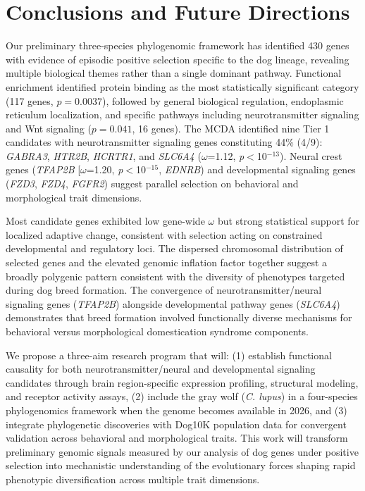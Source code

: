 \documentclass[11pt,letterpaper]{article}
\begin{document}
\section{Conclusions and Future Directions}

Our preliminary three-species phylogenomic framework has identified 430 genes with evidence of episodic positive selection specific to the dog lineage, revealing multiple biological themes rather than a single dominant pathway. Functional enrichment identified protein binding as the most statistically significant category (117 genes, $p=0.0037$), followed by general biological regulation, endoplasmic reticulum localization, and specific pathways including neurotransmitter signaling and Wnt signaling ($p=0.041$, 16 genes). The MCDA identified nine Tier 1 candidates with neurotransmitter signaling genes constituting 44\% (4/9): \textit{GABRA3}, \textit{HTR2B}, \textit{HCRTR1}, and \textit{SLC6A4} ($\omega$=1.12, \textit{p}$<$10$^{-13}$). Neural crest genes (\textit{TFAP2B} [$\omega$=1.20, \textit{p}$<$10$^{-15}$, \textit{EDNRB}) and developmental signaling genes (\textit{FZD3}, \textit{FZD4}, \textit{FGFR2}) suggest parallel selection on behavioral and morphological trait dimensions.

Most candidate genes exhibited low gene-wide $\omega$ but strong statistical support for localized adaptive change, consistent with selection acting on constrained developmental and regulatory loci. The dispersed chromosomal distribution of selected genes and the elevated genomic inflation factor together suggest a broadly polygenic pattern consistent with the diversity of phenotypes targeted during dog breed formation. The convergence of neurotransmitter/neural signaling genes (\textit{TFAP2B}) alongside developmental pathway genes (\textit{SLC6A4})  demonstrates that breed formation involved functionally diverse mechanisms for behavioral versus morphological domestication syndrome components.

We propose a three-aim research program that will: (1) establish functional causality for both neurotransmitter/neural and developmental signaling candidates through brain region-specific expression profiling, structural modeling, and receptor activity assays, (2) include the gray wolf (\textit{C. lupus}) in a four-species phylogenomics framework when the genome becomes available in 2026, and (3) integrate phylogenetic discoveries with Dog10K population data for convergent validation across behavioral and morphological traits. This work will transform preliminary genomic signals measured by our analysis of dog genes under positive selection into mechanistic understanding of the evolutionary forces shaping rapid phenotypic diversification across multiple trait dimensions.
\end{document}
